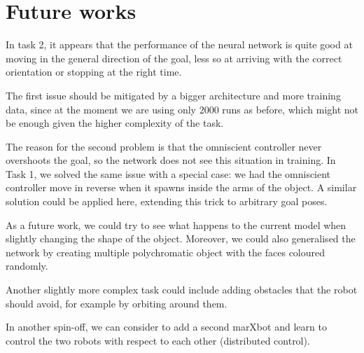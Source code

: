 \section{Future works}
In task 2, it appears that the performance of the neural network is quite good 
at moving in the general direction of the goal, less so at arriving with the 
correct orientation or stopping at the right time.

The first issue should be mitigated by a bigger architecture and more training 
data, since at the moment we are using only 2000 runs as before, which might 
not be enough given the higher complexity of the task.

The reason for the second problem is that the omniscient controller never 
overshoots the goal, so the network does not see this situation in training.
In Task 1, we solved the same issue with a special case: we had the omniscient 
controller move in reverse when it spawns inside the arms of the object. A 
similar solution could be applied here, extending this trick to arbitrary goal 
poses.

As a future work, we could try to see what happens to the current model when 
slightly changing the shape of the object. Moreover, we could also generalised 
the network by creating multiple polychromatic object with the faces coloured 
randomly. 

Another slightly more complex task could include adding obstacles that the 
robot should avoid, for example by orbiting around them.

In another spin-off, we can consider to add a second marXbot and learn to 
control the two robots with respect to each other (distributed control).
